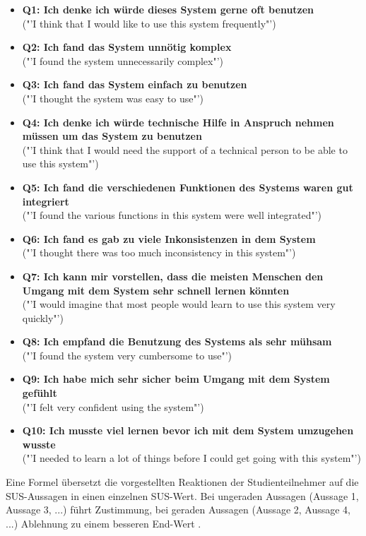 \documentclass[11pt,a4paper,twoside,ngerman]{article}
\begin{document}
\begin{itemize}
    \item \textbf{Q1: Ich denke ich würde dieses System gerne oft benutzen} \\ ("'I think that I would like to use this system frequently"')
    \item \textbf{Q2: Ich fand das System unnötig komplex} \\ ("'I found the system unnecessarily complex"')
    \item \textbf{Q3: Ich fand das System einfach zu benutzen} \\ ("'I thought the system was easy to use"')
    \item \textbf{Q4: Ich denke ich würde technische Hilfe in Anspruch nehmen müssen um das System zu benutzen} \\ ("'I think that I would need the support of a technical person to be able to use this system"')
    \item \textbf{Q5: Ich fand die verschiedenen Funktionen des Systems waren gut integriert} \\ ("'I found the various functions in this system were well integrated"')
    \item \textbf{Q6: Ich fand es gab zu viele Inkonsistenzen in dem System} \\ ("'I thought there was too much inconsistency in this system"')
    \item \textbf{Q7: Ich kann mir vorstellen, dass die meisten Menschen den Umgang mit dem System sehr schnell lernen könnten} \\ ("'I would imagine that most people would learn to use this system very quickly"')
    \item \textbf{Q8: Ich empfand die Benutzung des Systems als sehr mühsam} \\ ("'I found the system very cumbersome to use"')
    \item \textbf{Q9: Ich habe mich sehr sicher beim Umgang mit dem System gefühlt} \\ ("'I felt very confident using the system"')
    \item \textbf{Q10: Ich musste viel lernen bevor ich mit dem System umzugehen wusste} \\ ("'I needed to learn a lot of things before I could get going with this system"')
\end{itemize}

\noindent
Eine Formel übersetzt die vorgestellten Reaktionen der Studienteilnehmer auf die SUS-Aussagen in einen einzelnen SUS-Wert. Bei ungeraden Aussagen (Aussage 1, Aussage 3, ...) führt Zustimmung, bei geraden Aussagen (Aussage 2, Aussage 4, ...) Ablehnung zu einem besseren End-Wert \cite{brooke_sus}.
\end{document}
